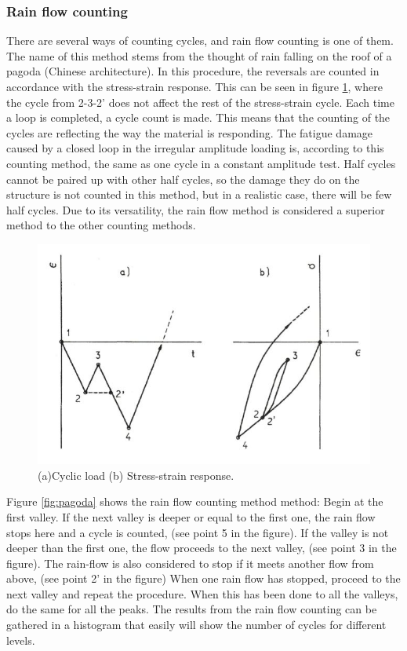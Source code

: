 \subsubsection{Rain flow counting}
\label{sec:rainflow}
There are several ways of counting cycles, and rain flow counting is one of them. The name of this method stems from the thought of rain falling on the roof of a pagoda (Chinese architecture). In this procedure, the reversals are counted in accordance with the stress-strain response. This can be seen in figure \ref{fig:count}, where the cycle from 2-3-2' does not affect the rest of the stress-strain cycle. Each time a loop is completed, a cycle count is made. This means that the counting of the cycles are reflecting the way the material is responding. The fatigue damage caused by a closed loop in the irregular amplitude loading is, according to this counting method, the same as one cycle in a constant amplitude test. Half cycles cannot be paired up with other half cycles, so the damage they do on the structure is not counted in this method, but in a realistic case, there will be few half cycles. Due to its versatility, the rain flow method is considered a superior method to the other counting methods. 

\begin{figure}[H]
\centering
\includegraphics[scale=0.6]{figures/count}
\caption[$\; \:$Cyclic load and stress-strain response]{(a)Cyclic load (b) Stress-strain response.   \cite{fatigue2016} }
 \label{fig:count}
\end{figure}

\noindent Figure \ref{fig:pagoda} shows the rain flow counting method method:\newline 
\newline
Begin at the first valley. If the next valley is deeper or equal to the first one, the rain flow stops here and a cycle is counted, (see point 5 in the figure). If the valley is not deeper than the first one, the flow proceeds to the next valley, (see point 3 in the figure). The rain-flow is also considered to stop if it meets another flow from above, (see point 2' in the figure) When one rain flow has stopped, proceed to the next valley and repeat the procedure. When this has been done to all the valleys, do the same for all the peaks. The results from the rain flow counting can be gathered in a histogram that easily will show the number of cycles for different levels. 

